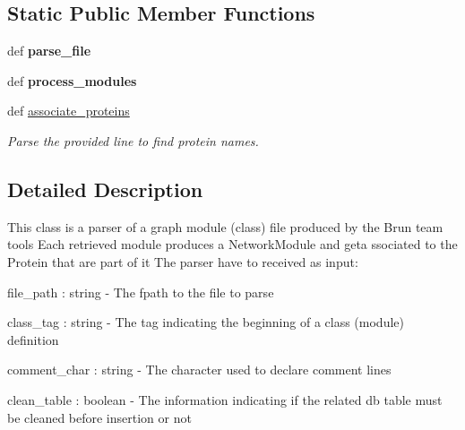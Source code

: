 \subsection*{Static Public Member Functions}
\begin{DoxyCompactItemize}
\item 
\hypertarget{classsrc_1_1fr_1_1tagc_1_1rainet_1_1core_1_1util_1_1parser_1_1NetworkModuleParser_1_1NetworkModuleParser_a5621046e5c53b4a62832a5b9d9882ae8}{def {\bfseries parse\-\_\-file}}\label{classsrc_1_1fr_1_1tagc_1_1rainet_1_1core_1_1util_1_1parser_1_1NetworkModuleParser_1_1NetworkModuleParser_a5621046e5c53b4a62832a5b9d9882ae8}

\item 
\hypertarget{classsrc_1_1fr_1_1tagc_1_1rainet_1_1core_1_1util_1_1parser_1_1NetworkModuleParser_1_1NetworkModuleParser_a1fa9241a137a38fe50ed095e6a6ddcf7}{def {\bfseries process\-\_\-modules}}\label{classsrc_1_1fr_1_1tagc_1_1rainet_1_1core_1_1util_1_1parser_1_1NetworkModuleParser_1_1NetworkModuleParser_a1fa9241a137a38fe50ed095e6a6ddcf7}

\item 
def \hyperlink{classsrc_1_1fr_1_1tagc_1_1rainet_1_1core_1_1util_1_1parser_1_1NetworkModuleParser_1_1NetworkModuleParser_a3e0f2f9aa4e9b800e02676eb720765e2}{associate\-\_\-proteins}
\begin{DoxyCompactList}\small\item\em Parse the provided line to find protein names. \end{DoxyCompactList}\end{DoxyCompactItemize}


\subsection{Detailed Description}
This class is a parser of a graph module (class) file produced by the Brun team tools Each retrieved module produces a Network\-Module and geta ssociated to the Protein that are part of it The parser have to received as input\-: 


\begin{DoxyItemize}
\item file\-\_\-path \-: string -\/ The fpath to the file to parse
\item class\-\_\-tag \-: string -\/ The tag indicating the beginning of a class (module) definition
\item comment\-\_\-char \-: string -\/ The character used to declare comment lines
\item clean\-\_\-table \-: boolean -\/ The information indicating if the related db table must be cleaned before insertion or not 
\end{DoxyItemize}

